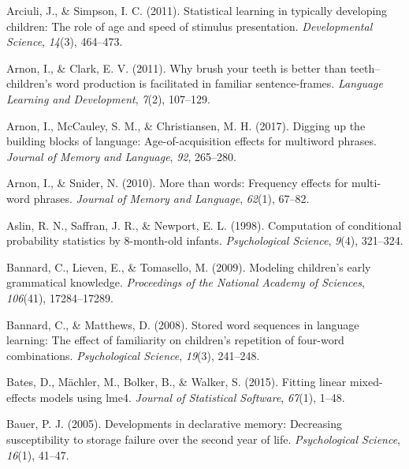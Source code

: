 \documentclass[
  english,
  man,floatsintext]{apa6}
\begin{document}
\begingroup
\setlength{\parindent}{-0.5in}
\setlength{\leftskip}{0.5in}

\hypertarget{refs}{}
\leavevmode\hypertarget{ref-arciuli2011statistical}{}%
Arciuli, J., \& Simpson, I. C. (2011). Statistical learning in typically developing children: The role of age and speed of stimulus presentation. \emph{Developmental Science}, \emph{14}(3), 464--473.

\leavevmode\hypertarget{ref-arnon2011brush}{}%
Arnon, I., \& Clark, E. V. (2011). Why brush your teeth is better than teeth--children's word production is facilitated in familiar sentence-frames. \emph{Language Learning and Development}, \emph{7}(2), 107--129.

\leavevmode\hypertarget{ref-arnon2017}{}%
Arnon, I., McCauley, S. M., \& Christiansen, M. H. (2017). Digging up the building blocks of language: Age-of-acquisition effects for multiword phrases. \emph{Journal of Memory and Language}, \emph{92}, 265--280.

\leavevmode\hypertarget{ref-arnon2010more}{}%
Arnon, I., \& Snider, N. (2010). More than words: Frequency effects for multi-word phrases. \emph{Journal of Memory and Language}, \emph{62}(1), 67--82.

\leavevmode\hypertarget{ref-aslin1998computation}{}%
Aslin, R. N., Saffran, J. R., \& Newport, E. L. (1998). Computation of conditional probability statistics by 8-month-old infants. \emph{Psychological Science}, \emph{9}(4), 321--324.

\leavevmode\hypertarget{ref-bannard2009modeling}{}%
Bannard, C., Lieven, E., \& Tomasello, M. (2009). Modeling children's early grammatical knowledge. \emph{Proceedings of the National Academy of Sciences}, \emph{106}(41), 17284--17289.

\leavevmode\hypertarget{ref-bannard2008stored}{}%
Bannard, C., \& Matthews, D. (2008). Stored word sequences in language learning: The effect of familiarity on children's repetition of four-word combinations. \emph{Psychological Science}, \emph{19}(3), 241--248.

\leavevmode\hypertarget{ref-lme4}{}%
Bates, D., Mächler, M., Bolker, B., \& Walker, S. (2015). Fitting linear mixed-effects models using lme4. \emph{Journal of Statistical Software}, \emph{67}(1), 1--48.

\leavevmode\hypertarget{ref-bauer2005developments}{}%
Bauer, P. J. (2005). Developments in declarative memory: Decreasing susceptibility to storage failure over the second year of life. \emph{Psychological Science}, \emph{16}(1), 41--47.
\end{document}

